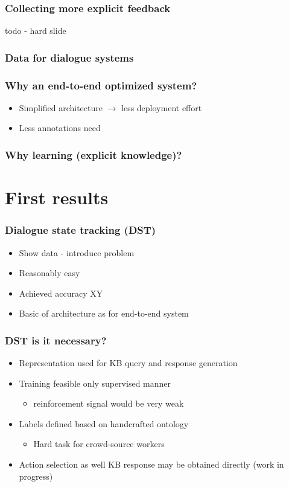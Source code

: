 \documentclass[10pt, compress,british,xcolor={svgnames,dvipsnames,x11names},trans]{beamer}
\begin{document}
\begin{frame}\frametitle{Collecting more explicit feedback}
   todo - hard slide 
\end{frame}

\begin{frame}\frametitle{Data for dialogue systems}
\end{frame}

\begin{frame}\frametitle{Why an end-to-end optimized system?}
    \begin{itemize}
        \item Simplified architecture $\longrightarrow$ less deployment effort
        \item Less annotations need 
    \end{itemize}
\end{frame}

\begin{frame}\frametitle{Why learning (explicit knowledge)?}
\end{frame}

\section{First results}  %


\begin{frame}\frametitle{Dialogue state tracking (DST)}
    \begin{itemize}
        \item Show data - introduce problem
        \item Reasonably easy
        \item Achieved accuracy XY
        \item Basic of architecture as for end-to-end system
    \end{itemize}
\end{frame}

\begin{frame}\frametitle{DST is it necessary?}
    \begin{itemize}
        \item Representation used for KB query and response generation
        \item Training feasible only supervised manner
        \begin{itemize}
            \item reinforcement signal would be very weak
        \end{itemize}
        \item Labels defined based on handcrafted ontology
        \begin{itemize}
            \item Hard task for crowd-source workers
        \end{itemize}
        \item Action selection as well KB response may be obtained directly (work in progress)
    \end{itemize}
\end{frame}
\end{document}

